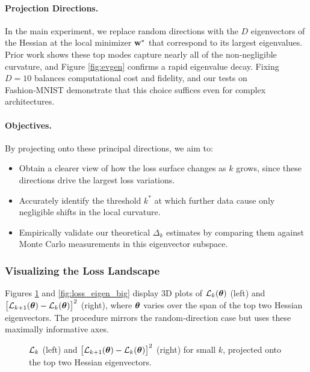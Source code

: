 \documentclass{article}
\begin{document}
\paragraph{Projection Directions.}
In the main experiment, we replace random directions with the $D$ eigenvectors of the Hessian at the local minimizer $\mathbf{w}^*$ that
correspond to its largest eigenvalues. Prior work \cite{sagun2018empirical} shows these top modes capture nearly all of the
non‑negligible curvature, and Figure \ref{fig:evgen} confirms a rapid eigenvalue decay. Fixing $D = 10$ balances computational cost and
fidelity, and our tests on Fashion‑MNIST demonstrate that this choice suffices even for complex architectures.

\paragraph{Objectives.}
By projecting onto these principal directions, we aim to:
\begin{itemize}
  \item Obtain a clearer view of how the loss surface changes as $k$ grows, since these directions drive the largest loss variations.
  \item Accurately identify the threshold $k^*$ at which further data cause only negligible shifts in the local curvature.
  \item Empirically validate our theoretical $\Delta_k$ estimates by comparing them against Monte Carlo measurements in this eigenvector
        subspace.
\end{itemize}

\subsubsection{Visualizing the Loss Landscape}

Figures \ref{fig:loss_eigen_small} and \ref{fig:loss_eigen_big} display 3D plots of $\mathcal{L}_k(\boldsymbol{\theta})$ (left) and
$\bigl[ \mathcal{L}_{k+1}(\boldsymbol{\theta}) - \mathcal{L}_k(\boldsymbol{\theta}) \bigr]^2$ (right), where $\boldsymbol{\theta}$ varies over the span of the top two Hessian eigenvectors.
The procedure mirrors the random‑direction case but uses these maximally informative axes.

\begin{figure}[!htbp]
  \hspace*{-2.2cm}
  \caption{$\mathcal{L}_k$ (left) and $\bigl[ \mathcal{L}_{k+1}(\boldsymbol{\theta}) - \mathcal{L}_k(\boldsymbol{\theta}) \bigr]^2$ (right) for small $k$, projected onto the top two Hessian eigenvectors.}
  \label{fig:loss_eigen_small}
\end{figure}
\end{document}
